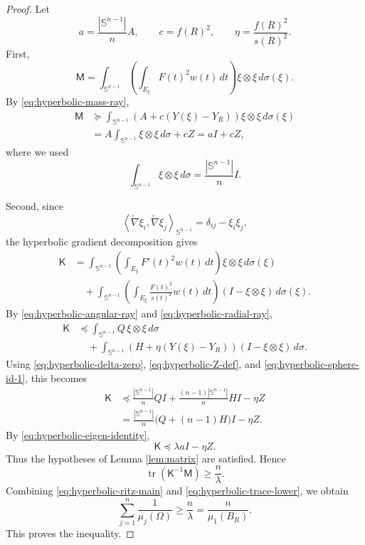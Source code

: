 \documentclass[11pt]{amsart}
\theoremstyle{remark}
\DeclareMathOperator{\tr}{tr}
\newcommand{\Sn}{\mathbb S}
\newcommand{\Id}{I}
\newcommand{\mcM}{\mathsf M}
\newcommand{\mcK}{\mathsf K}
\begin{document}
\begin{proof}
Let
\begin{equation}\label{eq:hyperbolic-aceta-def}
        a=\frac{|\Sn^{n-1}|}{n}A,
        \qquad
        c=f(R)^2,
        \qquad
        \eta=\frac{f(R)^2}{s(R)^2}.
\end{equation}
First,
$$
        \mcM
        =\int_{\Sn^{n-1}}
        \left(\int_{E_\xi}F(t)^2w(t)\,dt\right)
        \xi\otimes\xi\,d\sigma(\xi).
$$
By \eqref{eq:hyperbolic-mass-ray},
\begin{align*}
        \mcM
        &\succeq
        \int_{\Sn^{n-1}}
        \left(A+c(Y(\xi)-Y_R)\right)
        \xi\otimes\xi\,d\sigma(\xi)\\
        &=A\int_{\Sn^{n-1}}\xi\otimes\xi\,d\sigma+cZ
        =a\Id+cZ,
\end{align*}
where we used
\begin{equation}\label{eq:hyperbolic-sphere-id-1}
        \int_{\Sn^{n-1}}\xi\otimes\xi\,d\sigma=\frac{|\Sn^{n-1}|}{n}\Id.
\end{equation}

Second, since
$$
        \left\langle \widetilde\nabla \xi_i,\widetilde\nabla\xi_j\right\rangle_{\Sn^{n-1}}
        =\delta_{ij}-\xi_i\xi_j,
$$
the hyperbolic gradient decomposition gives
\begin{align*}
        \mcK
        &=\int_{\Sn^{n-1}}
        \left(\int_{E_\xi}F'(t)^2w(t)\,dt\right)
        \xi\otimes\xi\,d\sigma(\xi)\\
        &\quad+
        \int_{\Sn^{n-1}}
        \left(\int_{E_\xi}\frac{F(t)^2}{s(t)^2}w(t)\,dt\right)
        (\Id-\xi\otimes\xi)\,d\sigma(\xi).
\end{align*}
By \eqref{eq:hyperbolic-angular-ray} and \eqref{eq:hyperbolic-radial-ray},
\begin{align*}
        \mcK
        &\preceq
        \int_{\Sn^{n-1}}Q\,\xi\otimes\xi\,d\sigma\\
        &\quad+
        \int_{\Sn^{n-1}}
        \left(H+\eta(Y(\xi)-Y_R)\right)
        (\Id-\xi\otimes\xi)\,d\sigma.
\end{align*}
Using \eqref{eq:hyperbolic-delta-zero}, \eqref{eq:hyperbolic-Z-def}, and \eqref{eq:hyperbolic-sphere-id-1}, this becomes
\begin{align*}
        \mcK
        &\preceq
        \frac{|\Sn^{n-1}|}{n}Q\Id
        +\frac{(n-1)|\Sn^{n-1}|}{n}H\Id
        -\eta Z\\
        &=\frac{|\Sn^{n-1}|}{n}\bigl(Q+(n-1)H\bigr)\Id-\eta Z.
\end{align*}
By \eqref{eq:hyperbolic-eigen-identity},
\begin{equation}\label{eq:hyperbolic-K-bound-main}
        \mcK\preceq \lambda a\Id-\eta Z.
\end{equation}
Thus the hypotheses of Lemma \ref{lem:matrix} are satisfied.  Hence
\begin{equation}\label{eq:hyperbolic-trace-lower}
        \tr(\mcK^{-1}\mcM)\ge \frac{n}{\lambda}.
\end{equation}
Combining \eqref{eq:hyperbolic-ritz-main} and \eqref{eq:hyperbolic-trace-lower}, we obtain
$$
        \sum_{j=1}^n\frac1{\mu_j(\Omega)}
        \ge \frac{n}{\lambda}
        =\frac{n}{\mu_1(B_R)}.
$$
This proves the inequality.


\end{proof}
\end{document}
